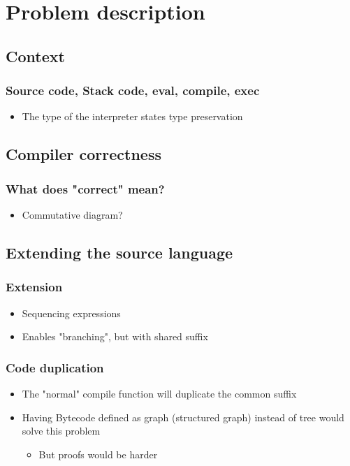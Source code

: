 \section{Problem description}

    \subsection{Context}
\begin{frame}[fragile]
            \frametitle{Source code, Stack code, eval, compile, exec}

            \begin{itemize}
                \item The type of the interpreter states type preservation
            \end{itemize}

\end{frame}


    \subsection{Compiler correctness}
        \begin{frame}
            \frametitle{What does "correct" mean?}

            \begin{itemize}
                \item Commutative diagram?
            \end{itemize}
        \end{frame}


    \subsection{Extending the source language}
        \begin{frame}
            \frametitle{Extension}

            \begin{itemize}
                \item Sequencing expressions
                \item Enables "branching", but with shared suffix
            \end{itemize}
        \end{frame}

        \begin{frame}
            \frametitle{Code duplication}

            \begin{itemize}
                \item The "normal" compile function will duplicate the common suffix
                \item Having Bytecode defined as graph (structured graph) instead of tree
                    would solve this problem
                    \begin{itemize}
                        \item But proofs would be harder
                    \end{itemize}
            \end{itemize}
        \end{frame}

